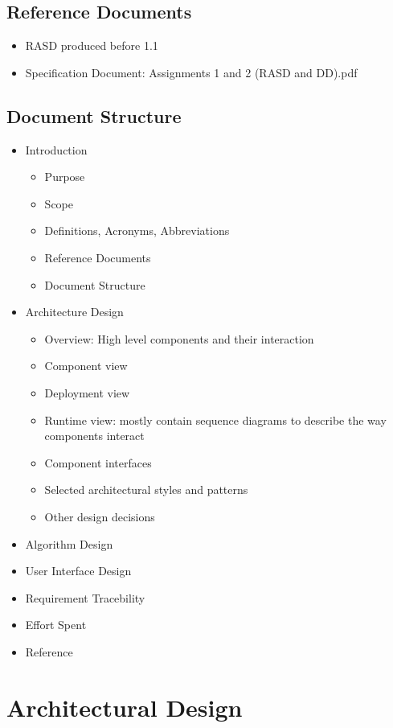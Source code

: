 \documentclass[12pt, letterpaper]{article}
\begin{document}
\subsection{Reference Documents} 

\begin{itemize}
	\item RASD produced before 1.1
	\item Specification Document: Assignments 1 and 2 (RASD and DD).pdf
\end{itemize}

\subsection{Document Structure}

\begin{itemize}
\item Introduction
	\begin{itemize}
		\item Purpose 
		\item Scope
		\item Definitions, Acronyms, Abbreviations
		\item Reference Documents
		\item Document Structure 
	\end{itemize}
\item Architecture Design
	\begin{itemize}
		\item Overview:	High level components and their interaction
		\item Component view
		\item Deployment view
		\item Runtime view: mostly contain sequence diagrams to describe the way components interact
		\item Component	interfaces
		\item Selected architectural styles and	patterns 
		\item Other	design decisions
	\end{itemize}
\item Algorithm Design
\item User Interface Design
\item Requirement Tracebility
\item Effort Spent
\item Reference

\end{itemize}

\newpage
\section{Architectural Design} 
\end{document}
